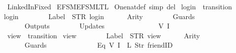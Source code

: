 %
\begin{isabellebody}%
%
%
\isadelimtheory
%
\endisadelimtheory
%
\isatagtheory
{}\isamarkupfalse%
\ Linked{\isacharunderscore}In{\isacharunderscore}Fixed\isanewline
{}\ {\isachardoublequoteopen}EFSM{\isachardot}EFSM{\isacharunderscore}LTL{\isachardoublequoteclose}\isanewline
{}%
\endisatagtheory
{\isafoldtheory}%
%
\isadelimtheory
\isanewline
%
\endisadelimtheory
\isanewline
{}\isamarkupfalse%
\ One{\isacharunderscore}nat{\isacharunderscore}def\ {\isacharbrackleft}simp\ del{\isacharbrackright}\isanewline
\isanewline
{}\isamarkupfalse%
\ {\isachardoublequoteopen}login{\isachardoublequoteclose}\ {\isacharcolon}{\isacharcolon}\ {\isachardoublequoteopen}transition{\isachardoublequoteclose}\ \isanewline
{\isachardoublequoteopen}login\ {\isasymequiv}\ {\isasymlparr}\isanewline
\ \ \ \ \ \ Label\ {\isacharequal}\ STR\ {\isacharprime}{\isacharprime}login{\isacharprime}{\isacharprime}{\isacharcomma}\isanewline
\ \ \ \ \ \ Arity\ {\isacharequal}\ {}{\isacharcomma}\isanewline
\ \ \ \ \ \ Guards\ {\isacharequal}\ {\isacharbrackleft}{\isacharbrackright}{\isacharcomma}\isanewline
\ \ \ \ \ \ Outputs\ {\isacharequal}\ {\isacharbrackleft}{\isacharbrackright}{\isacharcomma}\isanewline
\ \ \ \ \ \ Updates\ {\isacharequal}\ {\isacharbrackleft}\isanewline
\ \ \ \ \ \ \ \ \ \ \ \ {\isacharparenleft}{}{\isacharcomma}\ {\isacharparenleft}V\ {\isacharparenleft}I\ {}{\isacharparenright}{\isacharparenright}{\isacharparenright}\isanewline
\ \ \ \ \ \ {\isacharbrackright}\isanewline
{\isasymrparr}{\isachardoublequoteclose}\isanewline
\isanewline
{}\isamarkupfalse%
\ {\isachardoublequoteopen}view{\isachardoublequoteclose}\ {\isacharcolon}{\isacharcolon}\ {\isachardoublequoteopen}transition{\isachardoublequoteclose}\ \isanewline
{\isachardoublequoteopen}view\ {\isasymequiv}\ {\isasymlparr}\isanewline
\ \ \ \ \ \ Label\ {\isacharequal}\ STR\ {\isacharprime}{\isacharprime}view{\isacharprime}{\isacharprime}{\isacharcomma}\isanewline
\ \ \ \ \ \ Arity\ {\isacharequal}\ {}{\isacharcomma}\isanewline
\ \ \ \ \ \ Guards\ {\isacharequal}\ {\isacharbrackleft}\isanewline
\ \ \ \ \ \ \ \ \ \ \ \ Eq\ {\isacharparenleft}V\ {\isacharparenleft}I\ {}{\isacharparenright}{\isacharparenright}\ {\isacharparenleft}L\ {\isacharparenleft}Str\ {\isacharprime}{\isacharprime}friendID{\isacharprime}{\isacharprime}{\isacharparenright}{\isacharparenright}{\isacharcomma}\isanewline

\end{isabellebody}
